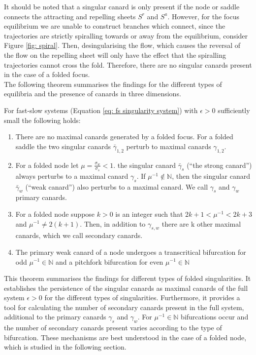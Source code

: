 It should be noted that a singular canard is only present if the node or saddle connects the attracting and repelling sheets $ S^r $ and $ S^a $.
However, for the focus equilibrium we are unable to construct branches which connect, since the trajectories are strictly spiralling towards or away from the equilibrium, consider Figure \ref{fig: spiral}. Then, desingularising the flow, which causes the reversal of the flow on the repelling sheet will only have the effect that the spiralling trajectories cannot cross the fold. Therefore, there are no singular canards present in the case of a folded focus.\\

The following theorem summarises the findings for the different types of equilibria and the presence of canards in three dimensions.
\begin{theorem}\label{thm: canards in R3}
	For fast-slow systems (Equation \ref{eq: fs singularity system}) with $ \epsilon>0 $ sufficiently small the following holds:
\begin{enumerate}
\item  There are no maximal canards generated by a folded focus. For a folded saddle the two singular canards $ \bar{\gamma}_{1,2} $ perturb to maximal canards $ \gamma_{1,2} $.
\item  For a folded node let $\mu=\frac{\sigma_w}{\sigma_s} <1$. the singular canard $ \bar{\gamma}_{s} $ (``the strong canard'') always perturbs to a maximal canard $ \gamma_{s} $. If $ \mu^{-1}\not \in \mathbb{N} $, then the singular canard $ \bar{\gamma}_{w} $ (``weak canard'') also perturbs to a maximal canard. We call $ \gamma_{s} $ and $ \gamma_{w} $ primary canards.
\item For a folded node suppose $ k>0 $ is an integer such that $ 2k+1<\mu^{-1} <2k+3$ and $ \mu^{-1}\neq 2(k+1) $. Then, in addition to $ \gamma_{s,w} $ there are k other maximal canards, which we call secondary canards.
\item The primary weak canard of a node undergoes a transcritical bifurcation for odd $ \mu^{-1}\in\mathbb{N} $ and a pitchfork bifurcation for even $ \mu^{-1}\in\mathbb{N} $
\end{enumerate}
\end{theorem}
This theorem summarises the findings for different types of folded singularities. It establishes the persistence of the singular canards as maximal canards of the full system $\epsilon >0$ for the different types of singularities. Furthermore, it provides a tool for calculating the number of secondary canards present in the full system, additional to the primary canards $\gamma_s$ and $\gamma_w$.
For $ \mu^{-1}\in\mathbb{N} $ bifurcations occur and the number of secondary canards present varies according to the type of bifurcation.
These mechanisms are best understood in the case of a folded node, which is studied in the following section.


